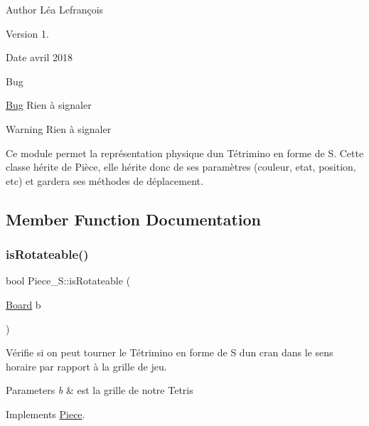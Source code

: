 \begin{DoxyAuthor}{Author}
Léa Lefrançois 
\end{DoxyAuthor}
\begin{DoxyVersion}{Version}
1. 
\end{DoxyVersion}
\begin{DoxyDate}{Date}
avril 2018 
\end{DoxyDate}
\begin{DoxyRefDesc}{Bug}
\item[\hyperlink{bug__bug000013}{Bug}]Rien à signaler \end{DoxyRefDesc}
\begin{DoxyWarning}{Warning}
Rien à signaler
\end{DoxyWarning}
Ce module permet la représentation physique d\textquotesingle{}un Tétrimino en forme de S. Cette classe hérite de Pièce, elle hérite donc de ses paramètres (couleur, etat, position, etc) et gardera ses méthodes de déplacement. 

\subsection{Member Function Documentation}
\mbox{\label{classPiece__S_a725b9e7b154628e035bcc7ebd2a3ec9f}} 
\subsubsection{\texorpdfstring{is\+Rotateable()}{isRotateable()}}
{\footnotesize\ttfamily bool Piece\+\_\+\+S\+::is\+Rotateable (\begin{DoxyParamCaption}\item[{\hyperlink{classBoard}{Board}}]{b }\end{DoxyParamCaption})\hspace{0.3cm}{\ttfamily [virtual]}}



Vérifie si on peut tourner le Tétrimino en forme de S d\textquotesingle{}un cran dans le sens horaire par rapport à la grille de jeu. 


\begin{DoxyParams}{Parameters}
{\em b} & est la grille de notre Tetris \\
\hline
\end{DoxyParams}


Implements \hyperlink{classPiece_a56cdf7f4234fe848a3e203b693b7a862}{Piece}.

